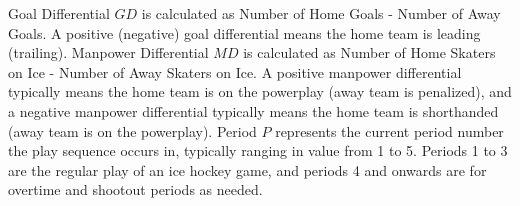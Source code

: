 \documentclass[]{article}
\begin{document}
\begin{table}[htdp]
\caption{Context Features}
\label{table:context-features}
\begin{center}
\end{center}
\label{default}
\end{table}%

Goal Differential $GD$ is calculated as Number of Home Goals - Number of Away Goals. A positive (negative) goal differential means the home team is leading (trailing).  Manpower Differential $MD$ is calculated as Number of Home Skaters on Ice - Number of Away Skaters on Ice. A positive manpower differential typically means the home team is on the powerplay (away team is penalized), and a negative manpower differential typically means the home team is shorthanded (away team is on the powerplay). Period $P$ represents the current period number the play sequence occurs in, typically ranging in value from 1 to 5. Periods 1 to 3 are the regular play of an ice hockey game, and periods 4 and onwards are for overtime and shootout periods as needed.


\end{document}
